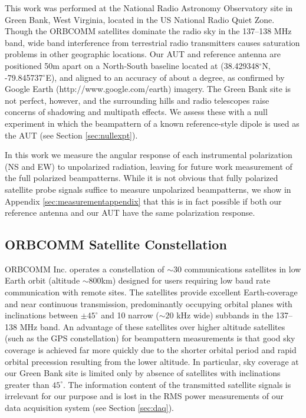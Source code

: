 This work was performed at the National Radio Astronomy Observatory site in Green Bank, West Virginia, located in the US National Radio Quiet Zone. Though the ORBCOMM satellites dominate the radio sky in the 137--138 MHz band, wide band interference from terrestrial radio transmitters causes saturation problems in other geographic locations. Our AUT and reference antenna are positioned 50m apart on a North-South baseline located at (38.429348$^\circ$N, -79.845737$^\circ$E), and aligned to an accuracy of about a degree, as confirmed by Google Earth (http://www.google.com/earth) imagery. The Green Bank site is not perfect, however, and the surrounding hills and radio telescopes raise concerns of  shadowing and multipath effects. We assess these with a null experiment in which the beampattern of a known reference-style dipole is used as the AUT (see Section \ref{sec:nullexpt}).

In this work we measure the angular response of each instrumental polarization (NS and EW) to unpolarized radiation, leaving for future work measurement of the full polarized beampatterns. While it is not obvious that fully polarized satellite probe signals suffice to measure unpolarized beampatterns, we show in Appendix \ref{sec:measurementappendix} that this is in fact possible if both our reference antenna and our AUT have the same polarization response. 

\subsection{ORBCOMM Satellite Constellation}
\label{sec:orbcomms}

ORBCOMM Inc. operates a constellation of $\sim30$ communications satellites in low Earth orbit (altitude $\sim800$km) designed for users requiring low baud rate communication with remote sites. The satellites provide excellent Earth-coverage and near continuous transmission, predominantly occupying orbital planes with inclinations between $\pm45^\circ$ and 10 narrow ($\sim20$ kHz wide) subbands in the 137--138 MHz band. An advantage of these satellites over higher altitude satellites (such as the GPS constellation) for beampattern measurements is that good sky coverage is achieved far more quickly due to the shorter orbital period and rapid orbital precession resulting from the lower altitude. In particular, sky coverage at our Green Bank site is limited only by absence of satellites with inclinations greater than $45^\circ$. The information content of the transmitted satellite signals is irrelevant for our purpose and is lost in the RMS power measurements of our data acquisition system (see Section \ref{sec:daq}). 

